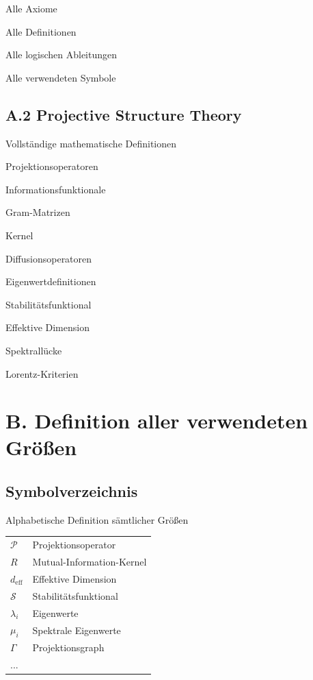 Alle Axiome

Alle Definitionen

Alle logischen Ableitungen

Alle verwendeten Symbole


\chapter{A.2 Projective Structure Theory}

Vollständige mathematische Definitionen

Projektionsoperatoren

Informationsfunktionale

Gram-Matrizen

Kernel

Diffusionsoperatoren

Eigenwertdefinitionen

Stabilitätsfunktional

Effektive Dimension

Spektrallücke

Lorentz-Kriterien

\part{B. Definition aller verwendeten Größen}

\chapter{Symbolverzeichnis}

Alphabetische Definition sämtlicher Größen

\begin{tabular}{ll}

$\mathcal P$
&
Projektionsoperator
\\

$R$
&
Mutual-Information-Kernel
\\

$d_{\mathrm{eff}}$
&
Effektive Dimension
\\

$\mathcal S$
&
Stabilitätsfunktional
\\

$\lambda_i$
&
Eigenwerte
\\

$\mu_i$
&
Spektrale Eigenwerte
\\

$\Gamma$
&
Projektionsgraph
\\

...

\end{tabular}

